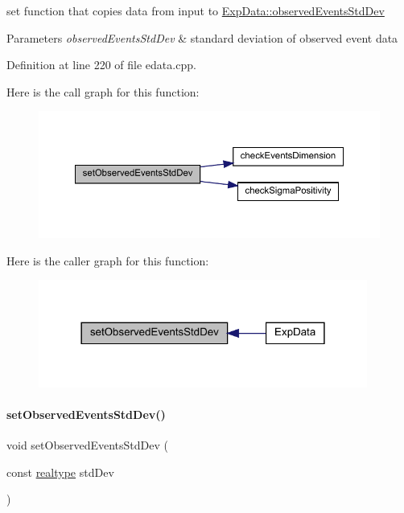 set function that copies data from input to \mbox{\hyperlink{classamici_1_1_exp_data_abb12a8f75b4e6c936ae6c0be770628c9}{Exp\+Data\+::observed\+Events\+Std\+Dev}}


\begin{DoxyParams}{Parameters}
{\em observed\+Events\+Std\+Dev} & standard deviation of observed event data \\
\hline
\end{DoxyParams}


Definition at line 220 of file edata.\+cpp.

Here is the call graph for this function\+:
\nopagebreak
\begin{figure}[H]
\begin{center}
\leavevmode
\includegraphics[width=350pt]{classamici_1_1_exp_data_af55c1775810031cd4b6e283f6dd220be_cgraph}
\end{center}
\end{figure}
Here is the caller graph for this function\+:
\nopagebreak
\begin{figure}[H]
\begin{center}
\leavevmode
\includegraphics[width=306pt]{classamici_1_1_exp_data_af55c1775810031cd4b6e283f6dd220be_icgraph}
\end{center}
\end{figure}
\mbox{\label{classamici_1_1_exp_data_a7be54ad0b0116325f4955f10a759a018}} 
\paragraph{\texorpdfstring{set\+Observed\+Events\+Std\+Dev()}{setObservedEventsStdDev()}\hspace{0.1cm}{\footnotesize\ttfamily [2/4]}}
{\footnotesize\ttfamily void set\+Observed\+Events\+Std\+Dev (\begin{DoxyParamCaption}\item[{const \mbox{\hyperlink{namespaceamici_a1bdce28051d6a53868f7ccbf5f2c14a3}{realtype}}}]{std\+Dev }\end{DoxyParamCaption})}

